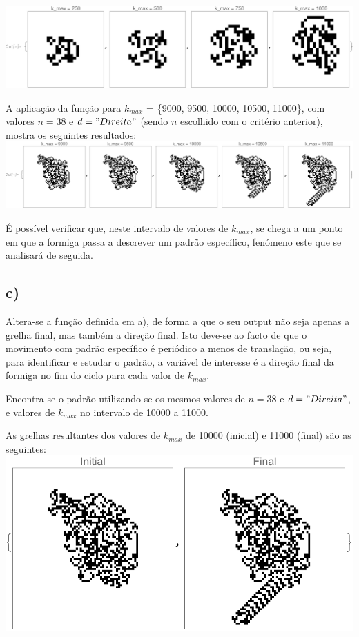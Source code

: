 \documentclass[12pt,a4paper]{article}
\begin{document}
        \includegraphics[width=17cm]{3b_1.pdf}

        A aplicação da função para \(k_{max}\) = \{9000, 9500, 10000, 10500, 11000\}, com valores \(n = 38\) e \(d = "Direita"\) (sendo \(n\) escolhido com o critério anterior), mostra os seguintes resultados: \\

        \includegraphics[width=17cm]{3b_2.pdf}

        É possível verificar que, neste intervalo de valores de \(k_{max}\), se chega a um ponto em que a formiga passa a descrever um padrão específico, fenómeno este que se analisará de seguida.

    \subsection{c)}
        Altera-se a função definida em a), de forma a que o seu output não seja apenas a grelha final, mas também a direção final. Isto deve-se ao facto de que o movimento com padrão específico é periódico a menos de translação, ou seja, para identificar e estudar o padrão, a variável de interesse é a direção final da formiga no fim do ciclo para cada valor de \(k_{max}\).

        Encontra-se o padrão utilizando-se os mesmos valores de \(n = 38\) e \(d = "Direita"\), e valores de \(k_{max}\) no intervalo de 10000 a 11000.

        As grelhas resultantes dos valores de \(k_{max}\) de 10000 (inicial) e 11000 (final) são as seguintes: \\

        \includegraphics[width=17cm]{3c_1.pdf}
\end{document}
